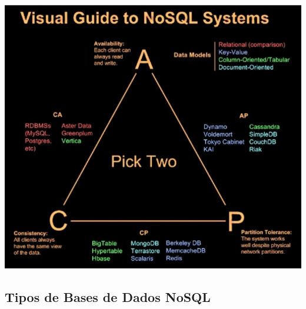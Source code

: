 \documentclass{article}
\begin{document}
\begin{center}
  \includegraphics[scale=0.3]{8}
\end{center}

\pagebreak

\subsection{Tipos de Bases de Dados NoSQL}
\end{document}
